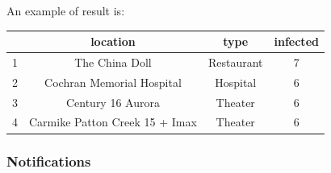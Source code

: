 \documentclass[12pt, a4paper]{article}
\begin{document}
\noindent %
An example of result is: 
\begin{center}
    \begin{tabular}{ |c|c|c|c|} 
        \hline
        & location & type & infected\\
        \hline
        1 & The China Doll & Restaurant & 7 \\
        2 & Cochran Memorial Hospital & Hospital & 6\\
        3 & Century 16 Aurora & Theater & 6\\
        4 & Carmike Patton Creek 15 + Imax & Theater & 6\\
        \hline
    \end{tabular}
\end{center}

\subsubsection{Notifications}
\end{document}
